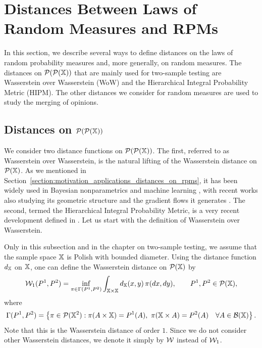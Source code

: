 \section{Distances Between Laws of Random Measures and RPMs}\label{section:bnp_toolbox_distances}


In this section, we describe several ways to define distances on the laws of random probability measures and, more generally, on random measures. The distances on $\mathcal{P}(\mathcal{P}(\mathbb{X}))$ that are mainly used for two-sample testing are Wasserstein over Wasserstein (WoW) and the Hierarchical Integral Probability Metric (HIPM). The other distances we consider for random measures are used to study the merging of opinions.

\subsection{Distances on $\mathcal{P}(\mathcal{P}(\mathbb{X}))$}\label{subsection:bnp_toolbox_distances_probprobx}

We consider two distance functions on $\mathcal{P}(\mathcal{P}(\mathbb{X}))$. The first, referred to as Wasserstein over Wasserstein, is the natural lifting of the Wasserstein distance on $\mathcal{P}(\mathbb{X})$. As we mentioned in Section~\ref{section:motivation_applications_distances_on_rpms}, it has been widely used in Bayesian nonparametrics \cite{nguyen2016borrowing,nguyen2026optimal} and machine learning \cite{ho2017multilevel, dukler2019wasserstein,alvarezmelis2020geometric,piening2026generalized}, with recent works also studying its geometric structure \cite{pinzi2025nested,pinzi2025totally,beiglbock2025brenier} and the gradient flows it generates \cite{bonet2025flowing}. The second, termed the Hierarchical Integral Probability Metric, is a very recent development defined in \cite{catalano2024hierarchical}. Let us start with the definition of Wasserstein over Wasserstein.

Only in this subsection and in the chapter on two-sample testing, we assume that the sample space $\mathbb{X}$ is Polish with bounded diameter. Using the distance function $d_{\mathbb{X}}$ on $\mathbb{X}$, one can define the Wasserstein distance on $\mathcal{P}(\mathbb{X})$ by
\[
\mathcal{W}_1(P^1, P^2) = \inf_{\pi \in \Gamma(P^1, P^2)} \int_{\mathbb{X} \times \mathbb{X}} d_{\mathbb{X}}(x, y) \, \pi(dx, dy), \qquad P^1, P^2 \in \mathcal{P}(\mathbb{X}),
\]
where
\[
\Gamma(P^1, P^2) = \left\{ \pi \in \mathcal{P}(\mathbb{X}^2) : \pi(A \times \mathbb{X}) = P^1(A), \ \pi(\mathbb{X} \times A) = P^2(A) \quad \forall A \in \mathcal{B}(\mathbb{X}) \right\}.
\]
Note that this is the Wasserstein distance of order $1$. Since we do not consider other Wasserstein distances, we denote it simply by $\mathcal{W}$ instead of $\mathcal{W}_1$.

